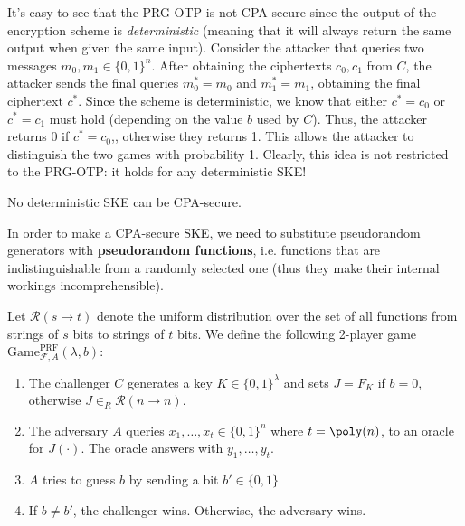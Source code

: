 \documentclass[a4paper, 12pt]{report}
\begin{document}
    It's easy to see that the PRG-OTP is not CPA-secure since the output of the encryption scheme is \textit{deterministic} (meaning that it will always return the same output when given the same input). Consider the attacker that queries two messages $m_0, m_1 \in \{0,1\}^n$. After obtaining the ciphertexts $c_0, c_1$ from $C$, the attacker sends the final queries $m_0^* = m_0$ and $m_1^* = m_1$, obtaining the final ciphertext $c^*$. Since the scheme is deterministic, we know that either $c^* = c_0$ or $c^* = c_1$ must hold (depending on the value $b$ used by $C$). Thus, the attacker returns 0 if $c^* = c_0$,, otherwise they returns 1. This allows the attacker to distinguish the two games with probability 1. Clearly, this idea is not restricted to the PRG-OTP: it holds for any deterministic SKE!

    \begin{framedprop}{}
        No deterministic SKE can be CPA-secure.
    \end{framedprop}

    In order to make a CPA-secure SKE, we need to substitute pseudorandom generators with \textbf{pseudorandom functions}, i.e. functions that are indistinguishable from a randomly selected one (thus they make their internal workings incomprehensible).

    Let $\mathcal{R}(s \to t)$ denote the uniform distribution over the set of all functions from strings of $s$ bits to strings of $t$ bits. We define the following 2-player game $\mathrm{Game}_{\mathcal{F},A}^{\text{PRF}}(\lambda, b)$:
    \begin{enumerate}
        \item The challenger $C$ generates a key $K \in \{0,1\}^\lambda$ and sets $J = F_K$ if $b = 0$, otherwise $J \in_R \mathcal{R}(n \to n)$.
        \item The adversary $A$ queries $x_1, \ldots, x_t \in \{0,1\}^n$ where $t = \poly(n)$, to an oracle for $J(\cdot)$. The oracle answers with $y_1, \ldots, y_t$.
        \item $A$ tries to guess $b$ by sending a bit $b' \in \{0,1\}$
        \item If $b \neq b'$, the challenger wins. Otherwise, the adversary wins.
    \end{enumerate}
\end{document}

